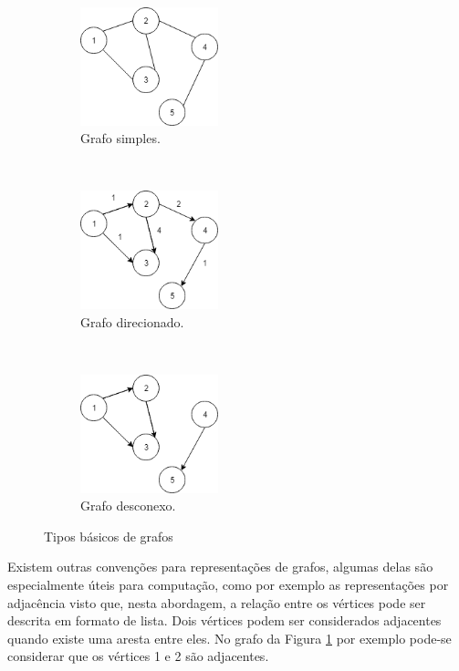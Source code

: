 \begin{figure}[t!]
	\centering
	\begin{subfigure}[t]{0.3\textwidth}
		\centering
		\includegraphics[width=4cm]{./figuras/grafo-simples.png} %
		\caption{Grafo simples.}
		\label{fig_grafo_simples}
	\end{subfigure}%
	~
	\begin{subfigure}[t]{0.3\textwidth}
		\centering
		\includegraphics[width=4cm]{./figuras/grafo-direcionado.png} %
	\caption{Grafo direcionado.}
	\label{fig_grafo_direcionado}
	\end{subfigure}
	~
	\begin{subfigure}[t]{0.3\textwidth}
		\centering
		\includegraphics[width=4cm]{./figuras/grafo-desconexo.png} %
	\caption{Grafo desconexo.}
	\label{fig_grafo_desconexo}
	\end{subfigure}
	\caption{Tipos básicos de grafos}
	\label{fig_tipos_grafos}
\end{figure}

Existem outras convenções para representações de grafos, algumas delas são especialmente úteis para computação, como por exemplo as representações por adjacência visto que, nesta abordagem, a relação entre os vértices pode ser descrita em formato de lista. Dois vértices podem ser considerados adjacentes quando existe uma aresta entre eles. No grafo da Figura \ref{fig_grafo_simples} por exemplo pode-se considerar que os vértices 1 e 2 são adjacentes.

